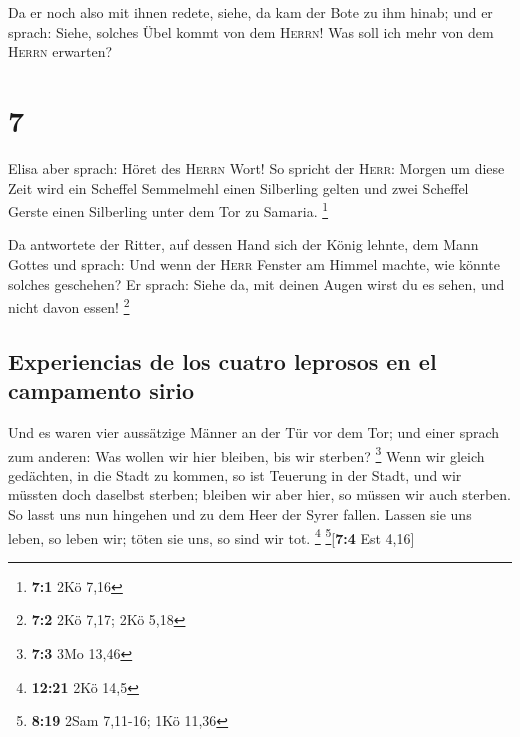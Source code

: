  Da er noch also mit ihnen redete, siehe, da kam der Bote
zu ihm hinab; und er sprach: Siehe, solches Übel kommt von dem
\textsc{Herrn}! Was soll ich mehr von dem \textsc{Herrn} erwarten?

\hypertarget{section-6}{%
\section{7}\label{section-6}}

 Elisa aber sprach: Höret des \textsc{Herrn} Wort! So
spricht der \textsc{Herr}: Morgen um diese Zeit wird ein Scheffel
Semmelmehl einen Silberling gelten und zwei Scheffel Gerste einen
Silberling unter dem Tor zu Samaria. \footnote{\textbf{7:1} 2Kö 7,16}

 Da antwortete der Ritter, auf dessen Hand sich der König
lehnte, dem Mann Gottes und sprach: Und wenn der \textsc{Herr} Fenster
am Himmel machte, wie könnte solches geschehen? Er sprach: Siehe da, mit
deinen Augen wirst du es sehen, und nicht davon essen! \footnote{\textbf{7:2}
  2Kö 7,17; 2Kö 5,18}

\hypertarget{experiencias-de-los-cuatro-leprosos-en-el-campamento-sirio}{%
\subsection{Experiencias de los cuatro leprosos en el campamento
sirio}\label{experiencias-de-los-cuatro-leprosos-en-el-campamento-sirio}}

 Und es waren vier aussätzige Männer an der Tür vor dem
Tor; und einer sprach zum anderen: Was wollen wir hier bleiben, bis wir
sterben? \footnote{\textbf{7:3} 3Mo 13,46}  Wenn wir
gleich gedächten, in die Stadt zu kommen, so ist Teuerung in der Stadt,
und wir müssten doch daselbst sterben; bleiben wir aber hier, so müssen
wir auch sterben. So lasst uns nun hingehen und zu dem Heer der Syrer
fallen. Lassen sie uns leben, so leben wir; töten sie uns, so sind wir
tot. \footnote{\textbf{12:21} 2Kö 14,5} \footnote{\textbf{8:19} 2Sam
  7,11-16; 1Kö 11,36}{[}\textbf{7:4} Est 4,16{]}

